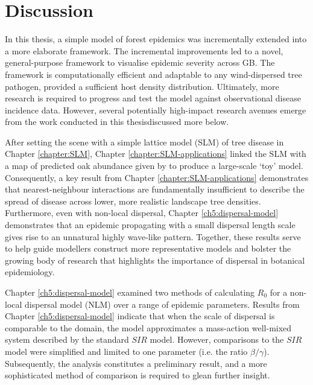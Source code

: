
\chapter{Discussion}

In this thesis, a simple model of forest epidemics was incrementally extended into a more elaborate framework.
The incremental improvements led to a novel, general-purpose framework to visualise epidemic severity across GB.
The framework is computationally efficient and adaptable to any wind-dispersed tree pathogen, provided a sufficient host density distribution.
Ultimately, more research is required to progress and test the model against observational disease incidence data.
However, several potentially high-impact research avenues emerge from the work conducted in this thesis\textemdash discussed more below.

After setting the scene with a simple lattice model (SLM) of tree disease in Chapter \ref{chapter:SLM}, 
Chapter \ref{chapter:SLM-applications} linked the SLM with a map of predicted oak abundance given by \cite{hill.data} to produce a large-scale `toy' model.
Consequently, a key result from Chapter \ref{chapter:SLM-applications} demonstrates that nearest-neighbour interactions are
fundamentally insufficient to describe the spread of disease across lower, more realistic landscape tree densities. 
Furthermore, even with non-local dispersal, Chapter \ref{ch5:dispersal-model} demonstrates that an epidemic propagating with a small dispersal length scale gives rise to an unnatural highly wave-like pattern. Together, these results serve to help guide modellers construct more representative models and bolster the growing body of research that highlights the importance of dispersal in botanical epidemiology.

Chapter \ref{ch5:dispersal-model} examined two methods of calculating $R_0$ for a non-local dispersal model (NLM) over a range of epidemic parameters.
Results from Chapter \ref{ch5:dispersal-model} indicate that when the scale of dispersal is comparable to the domain, the model approximates a mass-action well-mixed system described by the standard $SIR$ model. However, comparisons to the $SIR$ model were simplified and limited to one parameter (i.e. the ratio $\beta/\gamma$). Subsequently, the analysis constitutes a preliminary result, and a more sophisticated method of comparison is required to glean further insight.

